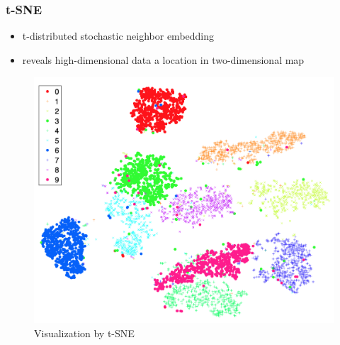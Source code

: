 \documentclass{beamer}
\begin{document}
    \begin{frame}
        \frametitle{t-SNE}

        \begin{itemize}
            \item t-distributed stochastic neighbor embedding
            \item reveals high-dimensional data a location in two-dimensional map \cite{tSNE1}
        \end{itemize}

        \begin{figure}
            \includegraphics[width=0.4 \linewidth]{figures/tSNE.png}
            \caption{Visualization by t-SNE \protect\cite{tSNE1}}
        \end{figure}
    \end{frame}
\end{document}
